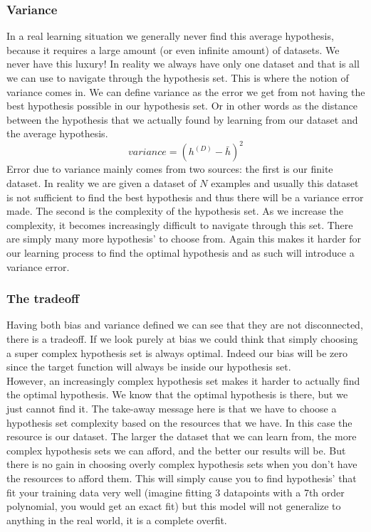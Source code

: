 \subsubsection{Variance}
In a real learning situation we generally never find this average hypothesis, because it requires a large amount (or even infinite amount) of datasets. We never have this luxury! In reality we always have only one dataset and that is all we can use to navigate through the hypothesis set. This is where the notion of variance comes in. We can define variance\cite{caltechmachinelearning} as the error we get from not having the best hypothesis possible in our hypothesis set. Or in other words as the distance between the hypothesis that we actually found by learning from our dataset and the average hypothesis.
$$
variance = (h^{(D)} - \bar{h})^{2}
$$
Error due to variance mainly comes from two sources: the first is our finite dataset. In reality we are given a dataset of $N$ examples and usually this dataset is not sufficient to find the best hypothesis and thus there will be a variance error made. The second is the complexity of the hypothesis set. As we increase the complexity, it becomes increasingly difficult to navigate through this set. There are simply many more hypothesis' to choose from. Again this makes it harder for our learning process to find the optimal hypothesis and as such will introduce a variance error.
\subsubsection{The tradeoff}
Having both bias and variance defined we can see that they are not disconnected, there is a tradeoff. If we look purely at bias we could think that simply choosing a super complex hypothesis set is always optimal. Indeed our bias will be zero since the target function will always be inside our hypothesis set. \\
However, an increasingly complex hypothesis set makes it harder to actually find the optimal hypothesis. We know that the optimal hypothesis is there, but we just cannot find it. The take-away message here is that we have to choose a hypothesis set complexity based on the resources that we have. In this case the resource is our dataset. The larger the dataset that we can learn from, the more complex hypothesis sets we can afford, and the better our results will be. But there is no gain in choosing overly complex hypothesis sets when you don't have the resources to afford them. This will simply cause you to find hypothesis' that fit your training data very well (imagine fitting 3 datapoints with a 7th order polynomial, you would get an exact fit) but this model will not generalize to anything in the real world, it is a complete overfit.
